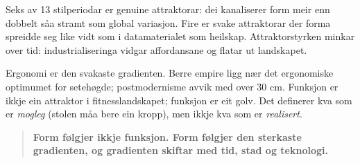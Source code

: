 \documentclass[10pt, a4paper, twocolumn]{article}
\begin{document}
Seks av 13 stilperiodar er genuine attraktorar: dei kanaliserer form meir enn dobbelt s\r{a}a stramt som global variasjon. Fire er svake attraktorar der forma spreidde seg like vidt som i datamaterialet som heilskap. Attraktorstyrken minkar over tid: industrialiseringa vidgar affordansane og flatar ut landskapet.

Ergonomi er den svakaste gradienten. Berre empire ligg n\ae r det ergonomiske optimumet for seteh\o gde; postmodernisme avvik med over 30 cm. Funksjon er ikkje ein attraktor i fitnesslandskapet; funksjon er eit golv. Det definerer kva som er \emph{mogleg} (stolen m\r{a}a bere ein kropp), men ikkje kva som er \emph{realisert}.

\begin{quote}
\textbf{Form f\o lgjer ikkje funksjon. Form f\o lgjer den sterkaste gradienten, og gradienten skiftar med tid, stad og teknologi.}
\end{quote}


\newpage
\onecolumn


\end{document}
